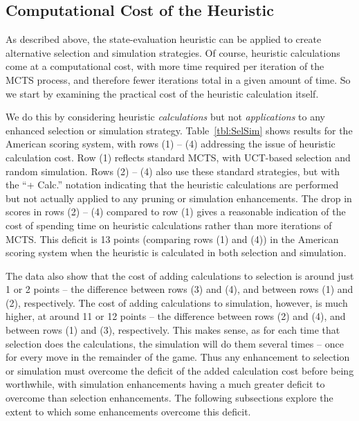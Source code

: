 \documentclass[letterpaper]{article}
\begin{document}
\subsection{Computational Cost of the Heuristic}

As described above, the state-evaluation heuristic can be applied to create alternative selection and simulation strategies. Of course, heuristic calculations come at a computational cost, with more time required per iteration of the MCTS process, and therefore fewer iterations total in a given amount of time. So we start by examining the practical cost of the heuristic calculation itself.

We do this by considering heuristic {\it calculations} but not {\it applications} to any enhanced selection or simulation strategy. Table~\ref{tbl:SelSim} shows results for the American scoring system, with rows (1) -- (4) addressing the issue of heuristic calculation cost. Row (1) reflects standard MCTS, with UCT-based selection and random simulation. Rows (2) -- (4) also use these standard strategies, but with the ``+ Calc.'' notation indicating that the heuristic calculations are performed but not actually applied to any pruning or simulation enhancements. The drop in scores in rows (2) -- (4) compared to row (1) gives a reasonable indication of the cost of spending time on heuristic calculations rather than more iterations of MCTS. This deficit is 13 points (comparing rows (1) and (4)) in the American scoring system when the heuristic is calculated in both selection and simulation.

The data also show that the cost of adding calculations to selection is around just 1 or 2 points -- the difference between rows (3) and (4), and between rows (1) and (2), respectively. The cost of adding calculations to simulation, however, is much higher, at around 11 or 12 points -- the difference between rows (2) and (4), and between rows (1) and (3), respectively. This makes sense, as for each time that selection does the calculations, the simulation will do them several times -- once for every move in the remainder of the game. Thus any enhancement to selection or simulation must overcome the deficit of the added calculation cost before being worthwhile, with simulation enhancements having a much greater deficit to overcome than selection enhancements. The following subsections explore the extent to which some enhancements overcome this deficit.
\end{document}

